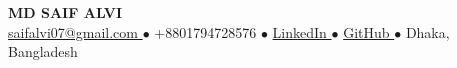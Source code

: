 \begin{center}
  {\LARGE\textbf{MD SAIF ALVI}}\\[0.4em]
  \small
  \href{mailto:saifalvi07@gmail.com}{saifalvi07@gmail.com } $\bullet$ {+8801794728576 } $\bullet$ \href{https://www.linkedin.com/in/saifalvi/}{LinkedIn } $\bullet$ \href{https://github.com/yuusaif}{GitHub } $\bullet$ Dhaka, Bangladesh
\end{center}

\vspace{0.5em}
